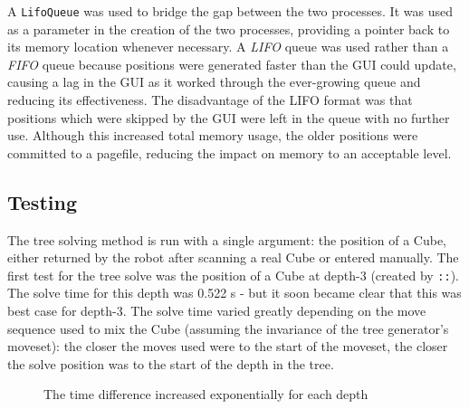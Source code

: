 \documentclass{report}
\newcommand{\tit}[1]{\textit{#1}}
\newcommand{\movesequencenospace}[1]{\uppercase{\texttt{:\formatmovesnospace{#1}:}}}
\newcommand{\depth}[1]{depth-#1}
\begin{document}
    A \lstinline|LifoQueue| was used to bridge the gap between the two processes. It was used as a parameter in the creation of the two processes, providing a pointer back to its memory location whenever necessary. A \tit{LIFO} queue was used rather than a \tit{FIFO} queue because positions were generated faster than the GUI could update, causing a lag in the GUI as it worked through the ever-growing queue and reducing its effectiveness. The disadvantage of the LIFO format was that positions which were skipped by the GUI were left in the queue with no further use. Although this increased total memory usage, the older positions were committed to a pagefile, reducing the impact on memory to an acceptable level.
    
    \subsection{Testing}

	The tree solving method is run with a single argument: the position of a Cube, either returned by the robot after scanning a real Cube or entered manually. The first test for the tree solve was the position of a Cube at \depth{3} (created by \movesequencenospace{l'd'u'}). The solve time for this depth was 0.522 \si{\second} - but it soon became clear that this was best case for \depth{3}. The solve time varied greatly depending on the move sequence used to mix the Cube (assuming the invariance of the tree generator's moveset): the closer the moves used were to the start of the moveset, the closer the solve position was to the start of the depth in the tree.
    
   	\begin{figure}[H]
    	\begin{center}
    		\caption{The time difference increased exponentially for each depth}
    		\label{fig:treeSolveGraph}
    	\end{center}
    \end{figure}
    
\end{document}
